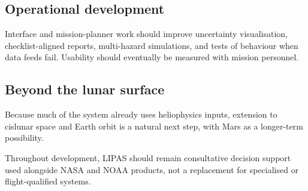 \subsection{Operational development}

Interface and mission-planner work should improve uncertainty visualisation, checklist-aligned reports, multi-hazard simulations, and tests of behaviour when data feeds fail. Usability should eventually be measured with mission personnel.

\subsection{Beyond the lunar surface}

Because much of the system already uses heliophysics inputs, extension to cislunar space and Earth orbit is a natural next step, with Mars as a longer-term possibility.

Throughout development, LIPAS should remain consultative decision support used alongside NASA and NOAA products, not a replacement for specialised or flight-qualified systems.

